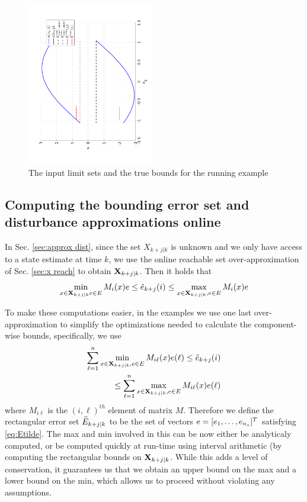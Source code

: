 \begin{figure}
\includegraphics[angle=270,width=0.49\textwidth]{figs/InputToy.pdf}
\caption{The input limit sets and the true bounds for the running example}
\label{fig:err_bound_toy}
\end{figure}


\subsection{Computing the bounding error set and disturbance approximations online}

In Sec. \ref{sec:approx dist}, since the set $X_{k+j|k}$ is unknown and we only have access to a state estimate at time $k$, we use the online reachable set over-approximation of Sec. \ref{sec:x reach} to obtain $\mathbf{X}_{k+j|k}$.
Then it holds that 
\[\min_{x \in \mathbf{X}_{k+j|k} e \in E}M_i(x)e \leq \tilde{e}_{k+j}(i) \leq \max_{x \in \mathbf{X}_{k+j|k}, e \in E} M_i(x)e\]

To make these computations easier, in the examples we use one last over-approximation to simplify the optimizations needed to calculate the component-wise bounds, specifically, we use 
\begin{eqnarray}
\label{eq:Etilde}
\sum_{\ell=1}^{n} \min_{x \in \mathbf{X}_{k+j|k}, e \in E} M_{i\ell}(x)e(\ell)  \leq \tilde{e}_{k+j}(i) 
\nonumber 
\\
\leq \sum_{\ell=1}^{n} \max_{x \in \mathbf{X}_{k+j|k}, e \in E} M_{i\ell}(x)e(\ell)
\end{eqnarray}
where $M_{i\ell}$ is the $(i,\ell)^{th}$ element of matrix $M$.
Therefore we define the rectangular error set $\widetilde{E}_{k+j|k}$ to be the set of vectors $e = [e_1,\ldots, e_{n_z}]^T$ satisfying \eqref{eq:Etilde}. The max and min involved in this can be now either be analyticaly computed, or be computed quickly at run-time using interval arithmetic (by computing the rectangular bounds on $\mathbf{X}_{k+j|k}$. While this adds a level of conservation, it guarantees us that we obtain an upper bound on the max and a lower bound on the min, which allows us to proceed without violating any assumptions.

